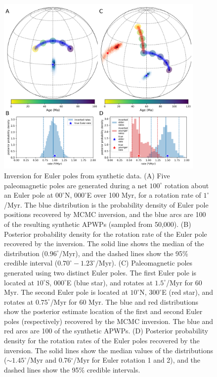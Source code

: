 \documentclass[11pt,letterpaper]{article}
\begin{document}
\begin{figure}
\centering
\includegraphics[width=0.9\textwidth]{fig_synthetic_pep.png}
\caption{Inversion for Euler poles from synthetic data. (A) Five paleomagnetic poles are generated during a net $100^\circ$ rotation about an Euler pole at $00^\circ$N, $000^\circ$E over 100 Myr, for a rotation rate of $1^\circ$/Myr. The blue distribution is the probability density of Euler pole positions recovered by MCMC inversion, and the blue arcs are 100 of the resulting synthetic APWPs (sampled from 50,000). (B) Posterior probability density for the rotation rate of the Euler pole recovered by the inversion. The solid line shows the median of the distribution ($0.96^\circ$/Myr), and the dashed lines show the 95\% credible interval ($0.70^\circ-1.23^\circ$/Myr). (C) Paleomagnetic poles generated using two distinct Euler poles. The first Euler pole is located at $10^\circ$S, $000^\circ$E (blue star), and rotates at $1.5^\circ$/Myr for 60 Myr. The second Euler pole is located at $10^\circ$N, $300^\circ$E (red star), and rotates at $0.75^\circ$/Myr for 60 Myr. The blue and red distributions show the posterior estimate location of the first and second Euler poles (respectively) recovered by the MCMC inversion. The blue and red arcs are 100 of the synthetic APWPs. (D) Posterior probability density for the rotation rates of the Euler poles recovered by the inversion. The solid lines show the median values of the distributions ($\sim 1.45^\circ$/Myr and 0.76$^\circ$/Myr for Euler rotation 1 and 2), and the dashed lines show the 95\% credible intervals.}
\label{fig:synthetic_pep}
\end{figure}
\end{document}
